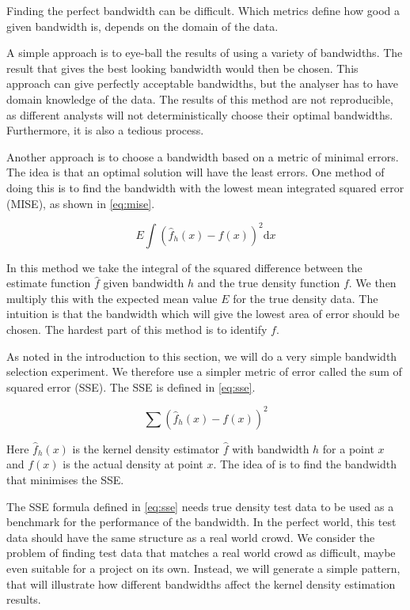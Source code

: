 Finding the perfect bandwidth can be difficult. Which metrics define how good a given bandwidth is, depends on the domain of the data.

A simple approach is to eye-ball the results of using a variety of bandwidths. The result that gives the best looking bandwidth would then be chosen. This approach can give perfectly acceptable bandwidths, but the analyser has to have domain knowledge of the data. The results of this method are not reproducible, as different analysts will not deterministically choose their optimal bandwidths. Furthermore, it is also a tedious process.

Another approach is to choose a bandwidth based on a metric of minimal errors. The idea is that an optimal solution will have the least errors. One method of doing this is to find the bandwidth with the lowest mean integrated squared error (MISE), as shown in \cref{eq:mise}.

\begin{equation}\label{eq:mise}
     E \int(\hat f_{h}(x) - f(x) )^2\mathrm{d}x
\end{equation}

In this method we take the integral of the squared difference between the estimate function $\hat f$ given bandwidth $h$ and the true density function $f$. We then multiply this with the expected mean value $E$ for the true density data. The intuition is that the bandwidth which will give the lowest area of error should be chosen. The hardest part of this method is to identify $f$.

As noted in the introduction to this section, we will do a very simple bandwidth selection experiment. We therefore use a simpler metric of error called the sum of squared error (SSE). The SSE is defined in \cref{eq:sse}.

\begin{equation}\label{eq:sse}
    \sum (\hat f_{h}(x) - f(x) )^2
\end{equation}

Here $\hat f_{h}(x)$ is the kernel density estimator $\hat f$ with bandwidth $h$ for a point $x$  and $f(x)$ is the actual density at point $x$. The idea of is to find the bandwidth that minimises the SSE.

The SSE formula defined in \cref{eq:sse} needs true density test data to be used as a benchmark for the performance of the bandwidth. In the perfect world, this test data should have the same structure as a real world crowd. We consider the problem of finding test data that matches a real world crowd as difficult, maybe even suitable for a project on its own. Instead, we will generate a simple pattern, that will illustrate how different bandwidths affect the kernel density estimation results.

